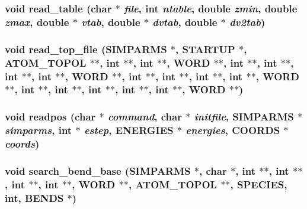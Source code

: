 \subsubsection{\setlength{\rightskip}{0pt plus 5cm}void read\_\-table (char $\ast$ {\em file}, int {\em ntable}, double {\em zmin}, double {\em zmax}, double $\ast$ {\em vtab}, double $\ast$ {\em dvtab}, double $\ast$ {\em dv2tab})}\label{input_2proto__input_8h_301c3c5dd44f22f60b06c27634625dc1}


\subsubsection{\setlength{\rightskip}{0pt plus 5cm}void read\_\-top\_\-file ({\bf SIMPARMS} $\ast$, {\bf STARTUP} $\ast$, {\bf ATOM\_\-TOPOL} $\ast$$\ast$, int $\ast$$\ast$, int $\ast$$\ast$, {\bf WORD} $\ast$$\ast$, int $\ast$$\ast$, int $\ast$$\ast$, int $\ast$$\ast$, int $\ast$$\ast$, {\bf WORD} $\ast$$\ast$, int $\ast$$\ast$, int $\ast$$\ast$, int $\ast$$\ast$, int $\ast$$\ast$, {\bf WORD} $\ast$$\ast$, int $\ast$$\ast$, int $\ast$$\ast$, int $\ast$$\ast$, int $\ast$$\ast$, int $\ast$$\ast$, {\bf WORD} $\ast$$\ast$)}\label{input_2proto__input_8h_60f050e1547ef4a9906ff26411df7be0}


\subsubsection{\setlength{\rightskip}{0pt plus 5cm}void readpos (char $\ast$ {\em command}, char $\ast$ {\em initfile}, {\bf SIMPARMS} $\ast$ {\em simparms}, int $\ast$ {\em estep}, {\bf ENERGIES} $\ast$ {\em energies}, {\bf COORDS} $\ast$ {\em coords})}\label{input_2proto__input_8h_afcc7b2f64187d1467219aafd655b801}


\subsubsection{\setlength{\rightskip}{0pt plus 5cm}void search\_\-bend\_\-base ({\bf SIMPARMS} $\ast$, char $\ast$, int $\ast$$\ast$, int $\ast$$\ast$, int $\ast$$\ast$, int $\ast$$\ast$, {\bf WORD} $\ast$$\ast$, {\bf ATOM\_\-TOPOL} $\ast$$\ast$, {\bf SPECIES}, int, {\bf BENDS} $\ast$)}\label{input_2proto__input_8h_0701417039b83bc30a5c7c66348794e3}


